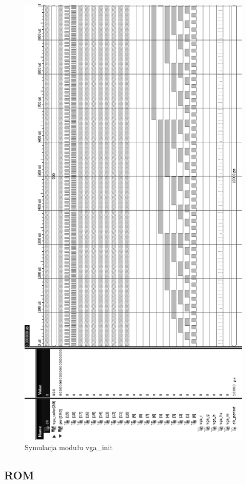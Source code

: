 \documentclass[11pt]{article}
\begin{document}
\begin{figure}[H]
\center
\includegraphics[scale=.6]{symulacja_vga.png}
\caption{Symulacja modułu vga\_init}
\end{figure}

\subsection{ROM}
\end{document}
